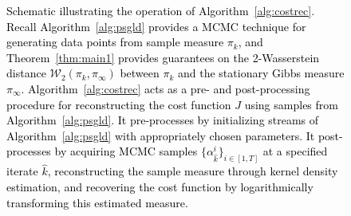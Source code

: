 \documentclass[journal,onecolumn]{IEEEtran}
\newcommand{\thk}{\theta_k}
\newcommand{\thkk}{\theta_{k+1}}
\newcommand{\step}{\epsilon}
\newcommand{\gradn}{\hat{\nabla}}
\newcommand{\rew}{J}
\newcommand{\dimn}{N}
\newcommand{\wass}{\mathcal{W}_2}
\newcommand{\gibbs}{\ids_{\infty}}
\newcommand{\dtlaw}{\ids_{k}} %
\newcommand{\ids}{\pi}
\newcommand{\idw}{\gamma}
\newcommand{\ksp}{k,\idw}
\newcommand{\mk}{\mathcal{K}}
\newcommand{\snum}{T}
\newcommand{\hk}{\hat{k}}
\begin{document}
\begin{figure}[h!]
    \caption{\small \textcolor{black}{Schematic illustrating the operation of Algorithm~\ref{alg:costrec}. Recall Algorithm~\ref{alg:psgld} provides a MCMC technique for generating data points from sample measure $\pi_k$, and Theorem~\ref{thm:main1} provides guarantees on the 2-Wasserstein distance $\wass(\dtlaw,\gibbs)$ between $\dtlaw$ and the stationary Gibbs measure $\gibbs$. Algorithm~\ref{alg:costrec} acts as a pre- and post-processing procedure for reconstructing the cost function $\rew$ using samples from Algorithm~\ref{alg:psgld}. It pre-processes by initializing streams of Algorithm~\ref{alg:psgld} with appropriately chosen parameters. It post-processes by acquiring MCMC samples $\{\alpha_{\hk}^i\}_{i\in[1,\snum]}$ at a specified iterate $\hk$, reconstructing the sample measure through kernel density estimation, and recovering the cost function by logarithmically transforming this estimated measure.}
    }\label{fig:alg3chart}
\end{figure}
\end{document}
